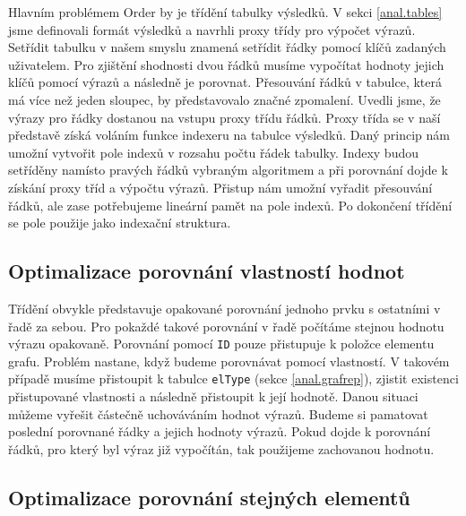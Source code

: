 Hlavním problémem Order by je třídění tabulky výsledků.
V sekci \ref{anal.tables} jsme definovali formát výsledků a navrhli proxy třídy pro výpočet výrazů.
Setřídit tabulku v našem smyslu znamená setřídit řádky pomocí klíčů zadaných uživatelem.
Pro zjištění shodnosti dvou řádků musíme vypočítat hodnoty jejich klíčů pomocí výrazů a následně je porovnat.
Přesouvání řádků v tabulce, která má více než jeden sloupec, by představovalo značné zpomalení.
Uvedli jsme, že výrazy pro řádky dostanou na vstupu proxy třídu řádků.
Proxy třída se v naší představě získá voláním funkce indexeru na tabulce výsledků.
Daný princip nám umožní vytvořit pole indexů v rozsahu počtu řádek tabulky.
Indexy budou setříděny namísto pravých řádků vybraným algoritmem a při porovnání dojde k získání proxy tříd a výpočtu výrazů.
Přistup nám umožní vyřadit přesouvání řádků, ale zase potřebujeme lineární pamět na pole indexů.
Po dokončení třídění se pole použije jako indexační struktura.

\subsection{Optimalizace porovnání vlastností hodnot} \label{anal.orderby.opt1}

Třídění obvykle představuje opakované porovnání jednoho prvku s ostatními v řadě za sebou.
Pro pokaždé takové porovnání v řadě počítáme stejnou hodnotu výrazu opakovaně.
Porovnání pomocí \texttt{ID} pouze přistupuje k položce elementu grafu.
Problém nastane, když budeme porovnávat pomocí vlastností.
V takovém případě musíme přistoupit k tabulce \texttt{elType} (sekce \ref{anal.grafrep}), zjistit existenci přistupované vlastnosti a následně přistoupit k její hodnotě.
Danou situaci můžeme vyřešit částečně uchováváním hodnot výrazů.
Budeme si pamatovat poslední porovnané řádky a jejich hodnoty výrazů.
Pokud dojde k porovnání řádků, pro který byl výraz již vypočítán, tak použijeme zachovanou hodnotu.

\subsection{Optimalizace porovnání stejných elementů} \label{anal.orderby.opt2}

